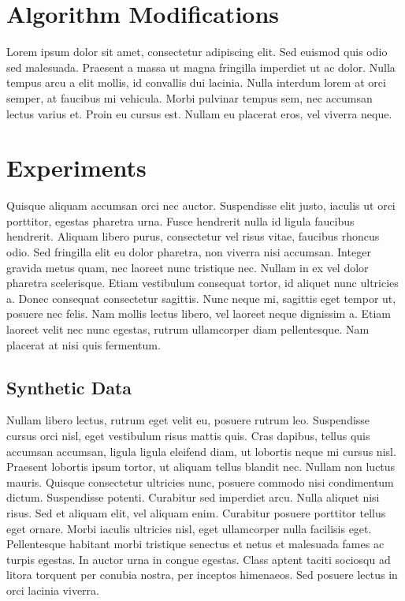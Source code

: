 \documentclass[11pt]{article}
\begin{document}
\break

\section{Algorithm Modifications}

Lorem ipsum dolor sit amet, consectetur adipiscing elit. Sed euismod quis odio sed malesuada. Praesent a massa ut magna
fringilla imperdiet ut ac dolor. Nulla tempus arcu a elit mollis, id convallis dui lacinia. Nulla interdum lorem at orci
 semper, at faucibus mi vehicula. Morbi pulvinar tempus sem, nec accumsan lectus varius et. Proin eu cursus est. Nullam
 eu placerat eros, vel viverra neque.


\section{Experiments}

Quisque aliquam accumsan orci nec auctor. Suspendisse elit justo, iaculis ut orci porttitor, egestas pharetra urna.
Fusce hendrerit nulla id ligula faucibus hendrerit. Aliquam libero purus, consectetur vel risus vitae, faucibus rhoncus
odio. Sed fringilla elit eu dolor pharetra, non viverra nisi accumsan. Integer gravida metus quam, nec laoreet nunc
tristique nec. Nullam in ex vel dolor pharetra scelerisque. Etiam vestibulum consequat tortor, id aliquet nunc ultricies
 a. Donec consequat consectetur sagittis. Nunc neque mi, sagittis eget tempor ut, posuere nec felis. Nam mollis lectus
 libero, vel laoreet neque dignissim a. Etiam laoreet velit nec nunc egestas, rutrum ullamcorper diam pellentesque. Nam
 placerat at nisi quis fermentum.
\subsection{Synthetic Data}

Nullam libero lectus, rutrum eget velit eu, posuere rutrum leo. Suspendisse cursus orci nisl, eget vestibulum risus
mattis quis. Cras dapibus, tellus quis accumsan accumsan, ligula ligula eleifend diam, ut lobortis neque mi cursus nisl.
 Praesent lobortis ipsum tortor, ut aliquam tellus blandit nec. Nullam non luctus mauris. Quisque consectetur ultricies
 nunc, posuere commodo nisi condimentum dictum. Suspendisse potenti. Curabitur sed imperdiet arcu. Nulla aliquet nisi
 risus. Sed et aliquam elit, vel aliquam enim. Curabitur posuere porttitor tellus eget ornare. Morbi iaculis ultricies
 nisl, eget ullamcorper nulla facilisis eget. Pellentesque habitant morbi tristique senectus et netus et malesuada fames
  ac turpis egestas. In auctor urna in congue egestas. Class aptent taciti sociosqu ad litora torquent per conubia
  nostra, per inceptos himenaeos. Sed posuere lectus in orci lacinia viverra.
\end{document}
